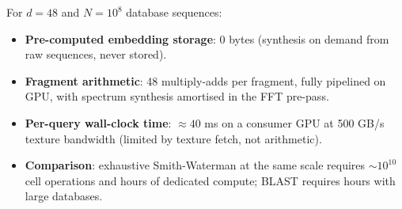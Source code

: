 For $d = 48$ and $N = 10^8$ database sequences:
\begin{itemize}
  \item \textbf{Pre-computed embedding storage}: 0 bytes (synthesis on demand
    from raw sequences, never stored).
  \item \textbf{Fragment arithmetic}: 48 multiply-adds per fragment, fully
    pipelined on GPU, with spectrum synthesis amortised in the FFT pre-pass.
  \item \textbf{Per-query wall-clock time}: $\approx 40$ ms on a consumer GPU
    at 500 GB/s texture bandwidth (limited by texture fetch, not arithmetic).
  \item \textbf{Comparison}: exhaustive Smith-Waterman at the same scale
    requires $\sim\!10^{10}$ cell operations and hours of dedicated compute;
    BLAST \citep{altschul1990} requires hours with large databases.
\end{itemize}


